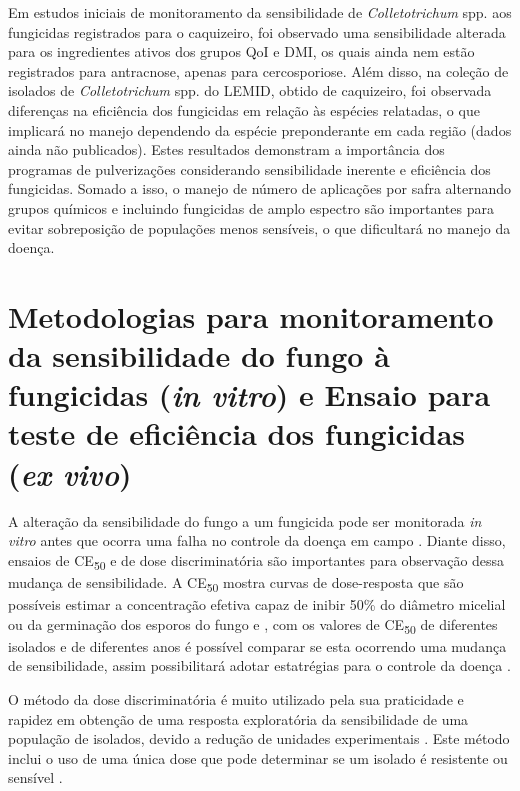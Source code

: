 \documentclass[a4paper,]{book}
\begin{document}
Em estudos iniciais de monitoramento da sensibilidade de
\emph{Colletotrichum} spp. aos fungicidas registrados para o caquizeiro,
foi observado uma sensibilidade alterada para os ingredientes ativos dos
grupos QoI e DMI, os quais ainda nem estão registrados para antracnose,
apenas para cercosporiose. Além disso, na coleção de isolados de
\emph{Colletotrichum} spp. do LEMID, obtido de caquizeiro, foi observada
diferenças na eficiência dos fungicidas em relação às espécies
relatadas, o que implicará no manejo dependendo da espécie preponderante
em cada região (dados ainda não publicados). Estes resultados demonstram
a importância dos programas de pulverizações considerando sensibilidade
inerente e eficiência dos fungicidas. Somado a isso, o manejo de número
de aplicações por safra alternando grupos químicos e incluindo
fungicidas de amplo espectro são importantes para evitar sobreposição de
populações menos sensíveis, o que dificultará no manejo da doença.

\section{\texorpdfstring{Metodologias para monitoramento da
sensibilidade do fungo à fungicidas (\emph{in vitro}) e Ensaio para
teste de eficiência dos fungicidas (\emph{ex
vivo})}{Metodologias para monitoramento da sensibilidade do fungo à fungicidas (in vitro) e Ensaio para teste de eficiência dos fungicidas (ex vivo)}}\label{metodologias-para-monitoramento-da-sensibilidade-do-fungo-a-fungicidas-in-vitro-e-ensaio-para-teste-de-eficiencia-dos-fungicidas-ex-vivo}

A alteração da sensibilidade do fungo a um fungicida pode ser monitorada
\emph{in vitro} antes que ocorra uma falha no controle da doença em
campo \citep{yuan2013}. Diante disso, ensaios de CE\textsubscript{50} e
de dose discriminatória são importantes para observação dessa mudança de
sensibilidade. A CE\textsubscript{50} mostra curvas de dose-resposta que
são possíveis estimar a concentração efetiva capaz de inibir 50\% do
diâmetro micelial ou da germinação dos esporos do fungo e , com os
valores de CE\textsubscript{50} de diferentes isolados e de diferentes
anos é possível comparar se esta ocorrendo uma mudança de sensibilidade,
assim possibilitará adotar estatrégias para o controle da doença
\citep{forster2004}.

O método da dose discriminatória é muito utilizado pela sua praticidade
e rapidez em obtenção de uma resposta exploratória da sensibilidade de
uma população de isolados, devido a redução de unidades experimentais
\citep{lichtemberg2016}. Este método inclui o uso de uma única dose que
pode determinar se um isolado é resistente ou sensível \citep{russell}.
\end{document}
